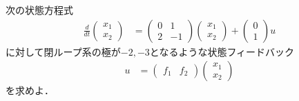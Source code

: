 \documentclass[a4paper,11pt,fleqn]{jreport}
\begin{document}
次の状態方程式
\begin{align*}
	\frac{d}{dt}
	\left (
	\begin{array}{c}
	 x_1 \\ x_2 
	\end{array}
	\right )
	& = 
	\left (
	\begin{array}{cc}
	 0 & 1 \\
	 2 & -1
	\end{array}
	\right )
	\left (
	\begin{array}{c}
	 x_1 \\ x_2 
	\end{array}
	\right )
	+
	\left (
	\begin{array}{c}
	 0 \\ 1 
	\end{array}
	\right )
	u
\end{align*}
に対して閉ループ系の極が$-2,-3$となるような状態フィードバック
\begin{align*}
	u 
	&=
	\left (
	\begin{array}{cc}
	 f_1 & f_2
	\end{array}
	\right )
	\left (
	\begin{array}{c}
	 x_1 \\ x_2 
	\end{array}
	\right )
\end{align*}
を求めよ．
\\
\end{document}
